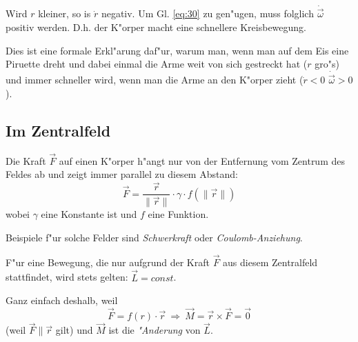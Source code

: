 Wird $r$ kleiner, so is $\dot r$ negativ. Um Gl. \eqref{eq:30} zu
gen"ugen, muss folglich $\dot{\vec \omega}$ positiv werden. D.h. der
K"orper macht eine schnellere Kreisbewegung.

Dies ist eine formale Erkl"arung daf"ur, warum man, wenn
man auf dem Eis eine Piruette dreht und dabei einmal die Arme weit von
sich gestreckt hat ($r$ gro"s) und immer schneller wird, wenn man die
Arme an den K"orper zieht ($\dot r < 0$ \Ipl $\dot{\vec \omega} > 0$).










\subsection{Im Zentralfeld}
\label{kap_im-zentralfeld}

\begin{Def}
Die Kraft $\vec F$ auf einen K"orper h"angt nur von der Entfernung vom
Zentrum des Feldes ab und zeigt immer parallel zu diesem Abstand:
\begin{equation}
   \label{eqn_def_zentralfeld}
   \vec F = \frac{\vec r}{\|\vec r\|} \cdot \gamma \cdot f(\|\vec r\|)
\end{equation}
wobei $\gamma$ eine Konstante ist und $f$ eine Funktion.
\end{Def}
Beispiele f"ur solche Felder sind \emph{Schwerkraft} oder
\emph{Coulomb-Anziehung}.


\begin{Wichtig}
F"ur eine Bewegung, die nur aufgrund der Kraft $\vec F$ aus diesem
Zentralfeld stattfindet, wird stets gelten: $\vec L = const$.    
\end{Wichtig}

Ganz
einfach deshalb, weil
$$
\vec F = f(r) \cdot \vec r ~ \Rightarrow ~ \vec M  = \vec r \times \vec F =
\vec 0
$$
(weil $\vec F \| \vec r$ gilt) und $\vec M$ ist die \emph{"Anderung} von $\vec L$.



